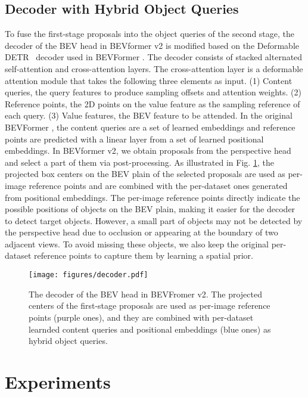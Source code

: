 \documentclass[10pt,twocolumn,letterpaper]{article}
\begin{document}
\subsection{Decoder with Hybrid Object Queries}
To fuse the first-stage proposals into the object queries of the second stage, the decoder of the BEV head in BEVformer v2 is modified based on the Deformable DETR~\cite{deformable-detr} decoder used in BEVFormer \cite{bevformer}. 
The decoder consists of stacked alternated self-attention and cross-attention layers. 
The cross-attention layer is a deformable attention module \cite{deformable-detr} that takes the following three elements as input. 
(1) Content queries, the query features to produce sampling offsets and attention weights.
(2) Reference points, the 2D points on the value feature as the sampling reference of each query.
(3) Value features, the BEV feature to be attended.
In the original BEVFormer \cite{bevformer}, the content queries are a set of learned embeddings and reference points are predicted with a linear layer from a set of learned positional embeddings. 
In BEVformer v2, we obtain proposals from the perspective head and select a part of them via post-processing.
As illustrated in Fig. \ref{fig:decoder}, the projected box centers on the BEV plain of the selected proposals are used as per-image reference points and are combined with the per-dataset ones generated from positional embeddings. 
The per-image reference points directly indicate the possible positions of objects on the BEV plain, making it easier for the decoder to detect target objects. 
However, a small part of objects may not be detected by the perspective head due to occlusion or appearing at the boundary of two adjacent views.
To avoid missing these objects, we also keep the original per-dataset reference points to capture them by learning a spatial prior. 

\begin{figure}[t]
    \centering
    \texttt{[image: figures/decoder.pdf]}
    \caption{The decoder of the BEV head in BEVFromer v2. The projected centers of the first-stage proposals are used as per-image reference points (purple ones), and they are combined with per-dataset learnded content queries and positional embeddings (blue ones) as hybrid object queries.}
    \label{fig:decoder}
    \vspace{-0.3cm}
\end{figure} \section{Experiments}
\end{document}
